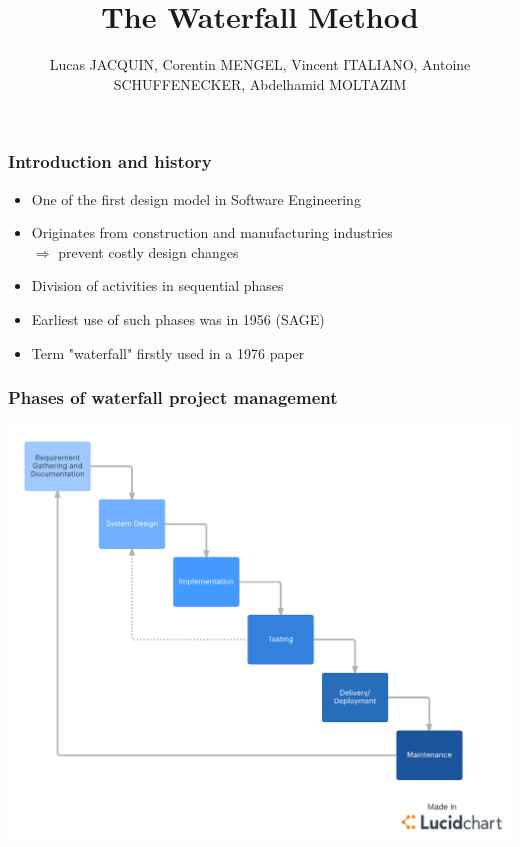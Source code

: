 \documentclass[handout]{beamer}
\title{The Waterfall Method}
\author{Lucas JACQUIN, Corentin MENGEL, Vincent ITALIANO, Antoine SCHUFFENECKER, Abdelhamid MOLTAZIM}
\begin{document}
\begin{frame}    
    
    \maketitle

\end{frame}

\begin{frame}
    \frametitle{Introduction and history}
    \begin{itemize}
        \setlength\itemsep{1em}
        \item One of the first design model in Software Engineering\pause
        \item Originates from construction and manufacturing industries \\ \quad\quad$\Rightarrow$ prevent costly design changes\pause
        \item Division of activities in sequential phases \pause
        \item Earliest use of such phases was in 1956 (SAGE) \pause
        \item Term "waterfall" firstly used in a 1976 paper
    \end{itemize}
\end{frame}

\begin{frame}
    \frametitle{Phases of waterfall project management}
    \includegraphics[scale=0.25]{Images/WaterfallDiagram.png}
\end{frame}
\end{document}
